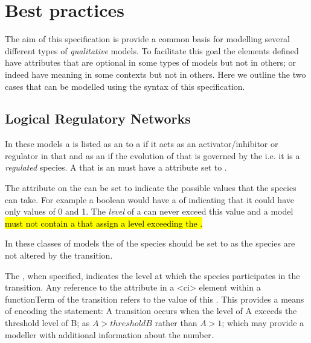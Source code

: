
\section{Best practices}
\label{best-practices}

The aim of this specification is provide a common basis for modelling several different types of \textit{qualitative} models. To facilitate this goal the elements defined have attributes that are optional in some types of models but not in others; or indeed have meaning in some contexts but not in others.  Here we outline the two cases that can be modelled using the syntax of this specification.

\subsection{Logical Regulatory Networks}

In these models a \QualitativeSpecies is listed as an \Input to a \Transition if it acts as an activator/inhibitor or regulator in that \Transition and as an \Output if the evolution of that \QualitativeSpecies is governed by the \Transition i.e. it is a \textit{regulated} species. A \QualitativeSpecies that is an \Output must have a  attribute set to .

The  attribute on the \QualitativeSpecies can be set to indicate the possible values that the species can take. For example a boolean would have a  of  indicating that it could have only values of 0 and 1. The \emph{level} of a \QualitativeSpecies can never exceed this value and a model \hl{must not contain a \FunctionTerm that assign a level exceeding the .}


In these classes of models the  of the \Input species should be set to  as the \Input species are not altered by the transition.


The , when specified, indicates the level at which the species participates in the transition. Any reference to the \Input {} attribute in a <ci> element within a functionTerm of the transition refers to the value of this . This provides a means of encoding the statement: A transition occurs when the level of A exceeds the threshold level of B; as $A > thresholdB$ rather than $A > 1$; which may provide a modeller with additional information about the number.


